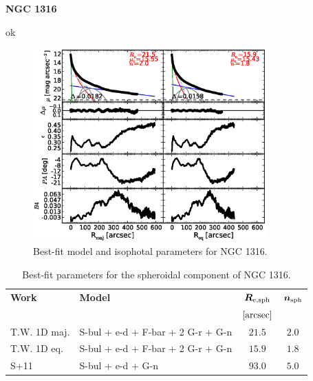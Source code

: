 \documentclass[preprint2]{emulateapj}
\newcommand{\fitfigurewidth}{0.8\textwidth}
\begin{document}
  \clearpage\newpage\noindent
  {\bf NGC 1316 \\}

  ok

  \begin{figure}[h]
  \begin{center}
  \includegraphics[width=\fitfigurewidth]{images/n1316_1Dfit.eps}
  \caption{Best-fit model and isophotal parameters for NGC 1316.}
  \end{center}
  \end{figure}

  \begin{table}[h]
  \small
  \caption{Best-fit parameters for the spheroidal component of NGC 1316.}
  \begin{center}
  \begin{tabular}{llcc}
  \hline
  {\bf Work} & {\bf Model}   & $\bm R_{\rm e,sph}$    & $\bm n_{\rm sph}$ \\
    &  &  $[\rm arcsec]$ & \\
  \hline
  T.W. 1D maj. & S-bul + e-d + F-bar + 2 G-r + G-n & $21.5$  &  $2.0$ \\
  T.W. 1D eq.  & S-bul + e-d + F-bar + 2 G-r + G-n & $15.9$  &  $1.8$ \\
  \hline
  S+11      & S-bul + e-d + G-n & $93.0$  &  $5.0$ \\
  \hline
  \end{tabular}
  \end{center}
  \label{tab:n1316}
  \end{table}
\end{document}
